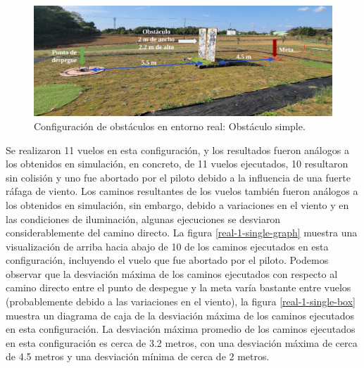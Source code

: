 \begin{figure}[H]
    \centering
    \includegraphics[scale=0.22]{partes/img/real-1-single-0-setup.png}
    \caption[Configuración de obstáculos en entorno real: Obstáculo simple]{Configuración de obstáculos en entorno real: Obstáculo simple.}
    \label{real-1-single-0-setup}
\end{figure}

Se realizaron 11 vuelos en esta configuración, y los resultados fueron análogos a los obtenidos en simulación, en concreto, de 11 vuelos ejecutados, 10 resultaron sin colisión y uno fue abortado por el piloto debido a la influencia de una fuerte ráfaga de viento. Los caminos resultantes de los vuelos también fueron análogos a los obtenidos en simulación, sin embargo, debido a variaciones en el viento y en las condiciones de iluminación, algunas ejecuciones se desviaron considerablemente del camino directo. La figura \ref{real-1-single-graph} muestra una visualización de arriba hacia abajo de 10 de los caminos ejecutados en esta configuración, incluyendo el vuelo que fue abortado por el piloto. Podemos observar que la desviación máxima de los caminos ejecutados con respecto al camino directo entre el punto de despegue y la meta varía bastante entre vuelos (probablemente debido a las variaciones en el viento), la figura \ref{real-1-single-box} muestra un diagrama de caja de la desviación máxima de los caminos ejecutados en esta configuración. La desviación máxima promedio de los caminos ejecutados en esta configuración es cerca de 3.2 metros, con una desviación máxima de cerca de 4.5 metros y una desviación mínima de cerca de 2 metros.

